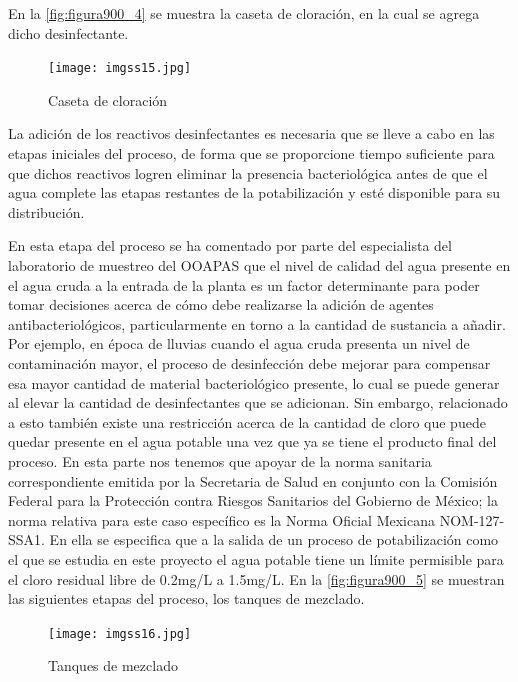 \clearpage

En la \autoref{fig:figura900_4} se muestra la caseta de cloración, en la cual se agrega dicho desinfectante.

\begin{figure}[h]
	\centering
	\texttt{[image: imgss15.jpg]}
	\caption{Caseta de cloración}
	\label{fig:figura900_4}
\end{figure}

La adición de los reactivos desinfectantes es necesaria que se lleve a cabo en las etapas iniciales del proceso, de forma que se proporcione tiempo suficiente para que 
dichos reactivos logren eliminar la presencia bacteriológica antes de que el agua complete las etapas restantes de la potabilización y esté disponible para su distribución.

En esta etapa del proceso se ha comentado por parte del especialista del laboratorio de muestreo del OOAPAS que el nivel de calidad del agua presente en el agua cruda a la entrada de la planta es un factor determinante para 
poder tomar decisiones acerca de cómo debe realizarse la adición de agentes antibacteriológicos, particularmente en torno a la cantidad de sustancia a añadir. Por ejemplo, en época de lluvias cuando el agua cruda presenta un 
nivel de contaminación mayor, el proceso de desinfección debe mejorar para compensar esa mayor cantidad de material bacteriológico presente, lo cual se puede generar al elevar la cantidad de desinfectantes que se adicionan. Sin 
embargo, relacionado a esto también existe una restricción acerca de la cantidad de cloro que puede quedar presente en el agua potable una vez que ya se tiene el producto final del proceso. En esta parte nos tenemos que 
apoyar de la norma sanitaria correspondiente emitida por la Secretaria de Salud en conjunto con la Comisión Federal para la Protección contra Riesgos Sanitarios del Gobierno de México; la norma relativa para este caso específico 
es la Norma Oficial Mexicana NOM-127-SSA1. En ella se especifica que a la salida de un proceso de potabilización como el que se estudia en este proyecto el agua potable tiene un límite permisible para el cloro residual libre 
de 0.2mg/L a 1.5mg/L.
\clearpage
En la \autoref{fig:figura900_5} se muestran las siguientes etapas del proceso, los tanques de mezclado.

\begin{figure}[h]
	\centering
	\texttt{[image: imgss16.jpg]}
	\caption{Tanques de mezclado}
	\label{fig:figura900_5}
\end{figure}

